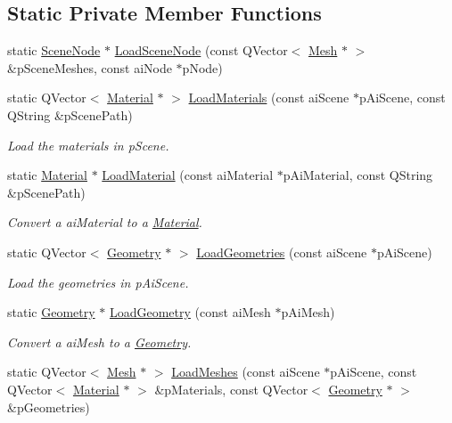 \subsection*{Static Private Member Functions}
\begin{DoxyCompactItemize}
\item 
static \hyperlink{class_scene_node}{Scene\+Node} $\ast$ \hyperlink{class_scene_loader_ad6583f2573153f2aff2bf32b8306fa37}{Load\+Scene\+Node} (const Q\+Vector$<$ \hyperlink{class_mesh}{Mesh} $\ast$ $>$ \&p\+Scene\+Meshes, const ai\+Node $\ast$p\+Node)
\item 
static Q\+Vector$<$ \hyperlink{class_material}{Material} $\ast$ $>$ \hyperlink{class_scene_loader_a70109946f3d24398944be25facb5ec85}{Load\+Materials} (const ai\+Scene $\ast$p\+Ai\+Scene, const Q\+String \&p\+Scene\+Path)
\begin{DoxyCompactList}\small\item\em Load the materials in p\+Scene. \end{DoxyCompactList}\item 
static \hyperlink{class_material}{Material} $\ast$ \hyperlink{class_scene_loader_a421f1c9ca296c902c747a916b96ab884}{Load\+Material} (const ai\+Material $\ast$p\+Ai\+Material, const Q\+String \&p\+Scene\+Path)
\begin{DoxyCompactList}\small\item\em Convert a ai\+Material to a \hyperlink{class_material}{Material}. \end{DoxyCompactList}\item 
static Q\+Vector$<$ \hyperlink{class_geometry}{Geometry} $\ast$ $>$ \hyperlink{class_scene_loader_a3bfad02ee655692106298834ac57c475}{Load\+Geometries} (const ai\+Scene $\ast$p\+Ai\+Scene)
\begin{DoxyCompactList}\small\item\em Load the geometries in p\+Ai\+Scene. \end{DoxyCompactList}\item 
static \hyperlink{class_geometry}{Geometry} $\ast$ \hyperlink{class_scene_loader_a4cde53be42d10e7220b46ddaf486b365}{Load\+Geometry} (const ai\+Mesh $\ast$p\+Ai\+Mesh)
\begin{DoxyCompactList}\small\item\em Convert a ai\+Mesh to a \hyperlink{class_geometry}{Geometry}. \end{DoxyCompactList}\item 
static Q\+Vector$<$ \hyperlink{class_mesh}{Mesh} $\ast$ $>$ \hyperlink{class_scene_loader_af01b36a657bd6f86b219f4c73d1eec62}{Load\+Meshes} (const ai\+Scene $\ast$p\+Ai\+Scene, const Q\+Vector$<$ \hyperlink{class_material}{Material} $\ast$ $>$ \&p\+Materials, const Q\+Vector$<$ \hyperlink{class_geometry}{Geometry} $\ast$ $>$ \&p\+Geometries)

\end{DoxyCompactItemize}
